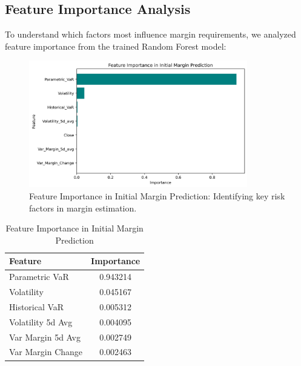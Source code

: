 \documentclass[a4paper,12pt]{article}
\begin{document}
\vspace{1em}
\subsection{Feature Importance Analysis}
To understand which factors most influence margin requirements, we analyzed feature importance from the trained Random Forest model:
\vspace{2.5em}
\FloatBarrier %
\begin{figure}[H]
    \centering
    \includegraphics[width=0.85\textwidth]{feature_importance.png}
    \caption{Feature Importance in Initial Margin Prediction: Identifying key risk factors in margin estimation.}
    \label{fig:feature_importance}
\end{figure}


\begin{table}[h]
    \centering
    \begin{tabular}{lc}
    \toprule
    \textbf{Feature} & \textbf{Importance} \\
    \midrule
    Parametric VaR & 0.943214 \\
    Volatility & 0.045167 \\
    Historical VaR & 0.005312 \\
    Volatility 5d Avg & 0.004095 \\
    Var Margin 5d Avg & 0.002749 \\
    Var Margin Change & 0.002463 \\
    \bottomrule
    \end{tabular}
    \caption{Feature Importance in Initial Margin Prediction}
    \label{tab:feature_importance}
\end{table}

\FloatBarrier %
\end{document}
